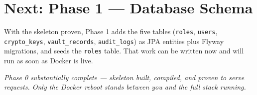 \documentclass[11pt,a4paper]{article}
\newcommand{\code}[1]{\texttt{#1}}
\begin{document}
\section{Next: Phase 1 --- Database Schema}
With the skeleton proven, Phase 1 adds the five tables (\code{roles}, \code{users},
\code{crypto\_keys}, \code{vault\_records}, \code{audit\_logs}) as JPA entities plus Flyway
migrations, and seeds the \code{roles} table. That work can be written now and will run as soon as
Docker is live.

\vspace{1em}
\begin{center}\itshape Phase 0 substantially complete --- skeleton built, compiled, and proven to
serve requests. Only the Docker reboot stands between you and the full stack running.\end{center}
\end{document}
